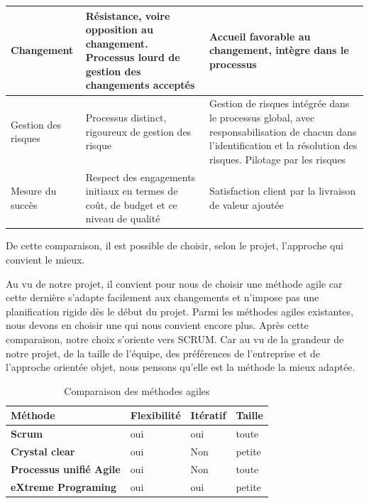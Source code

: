 \begin{table}[H]
\begin{tabular}{|l|p{5cm}|p{6cm}|}
		Changement          & Résistance, voire opposition au changement. Processus lourd de gestion des changements acceptés          & Accueil favorable au changement, intègre dans le processus                                                                                                           \\ \hline
		Gestion des risques & Processus distinct, rigoureux de gestion des risque                                                    & Gestion de risques intégrée dans le processus global, avec responsabilisation de chacun dans l’identification et la résolution des risques. Pilotage par les risques \\ \hline
		Mesure du succès    & Respect des engagements initiaux en termes de coût, de budget et ce niveau de qualité                 & Satisfaction client par la livraison de valeur ajoutée                                                                                                               \\ \hline
	\end{tabular}
\end{table}

De cette comparaison, il est possible de choisir, selon le projet, l’approche qui convient le
mieux.

Au vu de notre projet, il convient pour nous de choisir une méthode agile car cette dernière
s’adapte facilement aux changements et n’impose pas une planification rigide dès le début du
projet. Parmi les méthodes agiles existantes, nous devons en choisir une qui nous convient
encore plus. Après cette comparaison, notre choix s’oriente vers SCRUM.
Car au vu de la grandeur de notre projet, de la taille de l’équipe, des préférences de l’entreprise et de l’approche orientée objet, nous pensons qu’elle est la méthode la mieux adaptée.

\begin{table}[H]
	\centering
	\caption{Comparaison des méthodes agiles}
	\label{tab:my-table}
	\begin{tabular}{|l|l|l|l|}
		\hline
		\textbf{Méthode}                & \textbf{Flexibilité} & \textbf{Itératif} & \textbf{Taille} \\ \hline
		\textbf{Scrum}                  & oui                  & oui               & toute           \\ \hline
		\textbf{Crystal clear}          & oui                  & Non               & petite          \\ \hline
		\textbf{Processus unifié Agile} & oui                  & Non               & toute           \\ \hline
		\textbf{eXtreme Programing}     & oui                  & oui               & petite          \\ \hline
	\end{tabular}
\end{table}

